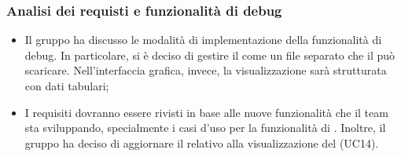 \subsubsection{Analisi dei requisti e funzionalità di debug}
\begin{itemize}
	\item Il gruppo ha discusso le modalità di implementazione della funzionalità di debug. In particolare, si è deciso di gestire il  come un file separato che il  può scaricare. Nell'interfaccia grafica, invece, la visualizzazione sarà strutturata con dati tabulari;
	\item I requisiti dovranno essere rivisti in base alle nuove funzionalità che il team sta sviluppando, specialmente i casi d'uso per la funzionalità di . Inoltre, il gruppo ha deciso di aggiornare il  relativo alla visualizzazione del (UC14).
\end{itemize}

